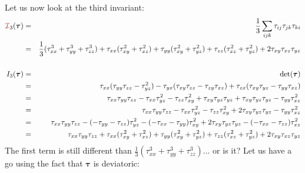Let us now look at the third invariant:
\begin{eqnarray}
{\III}_3(\bm\tau) 
&=& \frac13 \sum_{ijk} \tau_{ij}\tau_{jk}\tau_{ki} \nn\\
&=& \frac{1}{3}(\tau_{xx}^3 + \tau_{yy}^3 + \tau_{zz}^3) 
+\tau_{xx}(\tau_{xy}^2 + \tau_{xz}^2 ) 
+\tau_{yy}(\tau_{xy}^2 + \tau_{yz}^2 ) 
+\tau_{zz}(\tau_{xz}^2 + \tau_{yz}^2 ) 
+2\tau_{xy}\tau_{xz}\tau_{yz} 
\nn\\
\nn\\
I_3(\bm\tau) 
&=& {\rm det}(\bm \tau)  \nn\\
&=& \tau_{xx}   ( \tau_{yy}\tau_{zz} - \tau_{yz}^2   ) 
-\tau_{yx} (\tau_{xy}\tau_{zz} - \tau_{zy} \tau_{xz}  )
+\tau_{zx} (\tau_{xy}\tau_{yz} - \tau_{yy}\tau_{xz}  )\nn\\
&=&
\tau_{xx}   \tau_{yy}\tau_{zz} 
-\tau_{xx} \tau_{yz}^2   
-\tau_{zz} \tau_{xy}^2
+\tau_{xy}\tau_{yz}\tau_{yz}
+\tau_{xy}\tau_{yz}\tau_{yz}
-\tau_{yy} \tau_{xz}^2 \nn\\
&=&
\tau_{xx}   \tau_{yy}\tau_{zz} 
-\tau_{xx} \tau_{yz}^2   
-\tau_{zz} \tau_{xy}^2
+2\tau_{xy}\tau_{yz}\tau_{yz}
-\tau_{yy} \tau_{xz}^2 \nn\\
&=&
\tau_{xx}   \tau_{yy}\tau_{zz} 
-(-\tau_{yy}-\tau_{zz} )\tau_{yz}^2   
-(-\tau_{xx}-\tau_{yy}) \tau_{xy}^2
+2\tau_{xy}\tau_{yz}\tau_{yz}
-(-\tau_{xx}-\tau_{zz}) \tau_{xz}^2 \nn\\
&=& 
\tau_{xx}   \tau_{yy}\tau_{zz} 
+\tau_{xx}(\tau_{xy}^2 + \tau_{xz}^2 )
+\tau_{yy}(\tau_{xy}^2 + \tau_{yz}^2 )
+\tau_{zz}(\tau_{xz}^2 + \tau_{yz}^2 )
+2\tau_{xy}\tau_{xz}\tau_{yz} \nn
\end{eqnarray}
The first term is still different than $\frac13(\tau_{xx}^3 + \tau_{yy}^3 + \tau_{zz}^3)$... or is it?
Let us have a go using the fact that $\bm\tau$ is deviatoric:
